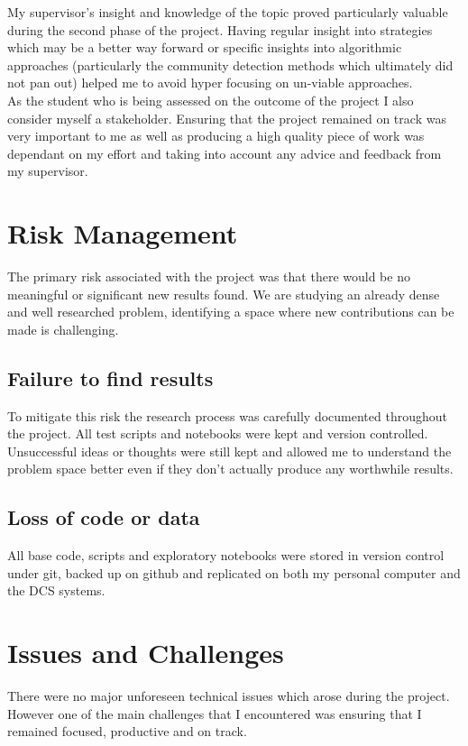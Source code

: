 \documentclass{article}
\begin{document}
My supervisor's insight and knowledge of the topic proved particularly valuable during the second phase of the project.
Having regular insight into strategies which may be a better way forward or specific insights into algorithmic approaches (particularly the community detection methods which ultimately did not pan out) helped me to avoid hyper focusing on un-viable approaches.
\\

As the student who is being assessed on the outcome of the project I also consider myself a stakeholder.
Ensuring that the project remained on track was very important to me as well as producing a high quality piece of work was dependant on my effort and taking into account any advice and feedback from my supervisor.

\section{Risk Management}

The primary risk associated with the project was that there would be no meaningful or significant new results found.
We are studying an already dense and well researched problem, identifying a space where new contributions can be made is challenging.

\subsection{Failure to find results}
To mitigate this risk the research process was carefully documented throughout the project.
All test scripts and notebooks were kept and version controlled.
Unsuccessful ideas or thoughts were still kept and allowed me to understand the problem space better even if they don't actually produce any worthwhile results.

\subsection{Loss of code or data}
All base code, scripts and exploratory notebooks were stored in version control under git, backed up on github and replicated on both my personal computer and the DCS systems.

\section{Issues and Challenges}
There were no major unforeseen technical issues which arose during the project.
However one of the main challenges that I encountered was ensuring that I remained focused, productive and on track. 
\end{document}
